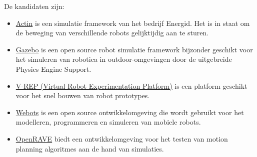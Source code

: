 \documentclass[a4paper, 11pt, oneside]{report}
\begin{document}
De kandidaten zijn:
\begin{itemize}
	\item \href{https://www.energid.com/actin}{Actin} is een simulatie framework van het bedrijf Energid. Het is in staat om de beweging van verschillende robots gelijktijdig aan te sturen.
	\item \href{http://gazebosim.org/}{Gazebo} is een open source robot simulatie framework bijzonder geschikt voor het simuleren van robotica in outdoor-omgevingen door de uitgebreide Physics Engine Support.
	\item \href{http://www.coppeliarobotics.com/}{V-REP (Virtual Robot Experimentation Platform)} is een platform geschikt voor het snel bouwen van robot prototypes.
	\item \href{https://cyberbotics.com/}{Webots} is een open source ontwikkelomgeving die wordt gebruikt voor het modelleren, programmeren en simuleren van mobiele robots.
	\item \href{http://openrave.org/}{OpenRAVE} biedt een ontwikkelomgeving voor het testen van motion planning algoritmes aan de hand van simulaties.
\end{itemize}
\end{document}
